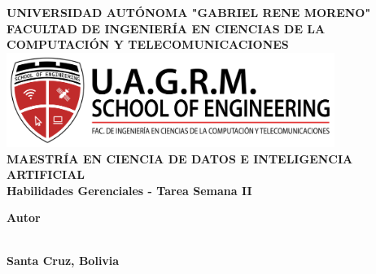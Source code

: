 \begin{titlepage}
    \begin{center}
        {\fontsize{15pt}{10pt}\selectfont\textbf{UNIVERSIDAD AUTÓNOMA "GABRIEL RENE MORENO"}} \\
        {\fontsize{15pt}{10pt}\selectfont\textbf{FACULTAD DE INGENIERÍA EN CIENCIAS DE LA COMPUTACIÓN Y TELECOMUNICACIONES}} \\
        \vspace{1cm}
        \includegraphics[width=0.8\textwidth]{images/logo_soe.png} \\
        
        {\fontsize{15pt}{10pt}\selectfont\textbf{MAESTRÍA EN CIENCIA DE DATOS E INTELIGENCIA ARTIFICIAL}} \\

        \vspace{1cm}
        {\fontsize{15pt}{5pt}\selectfont\textbf{Habilidades Gerenciales - Tarea Semana II}} \\
        \vspace{1cm}
        
        \vspace{2cm}
        \begin{flushright}
        {\fontsize{14pt}{22pt}\selectfont\textbf{Autor}} \\
        {\fontsize{14pt}{22pt}\selectfont{Ing. Darlyn Bravo Peña}} \\
        \end{flushright}
        
        
        
        \vfill
        \textbf{Santa Cruz, Bolivia} \\
    \end{center}
    \end{titlepage}
    